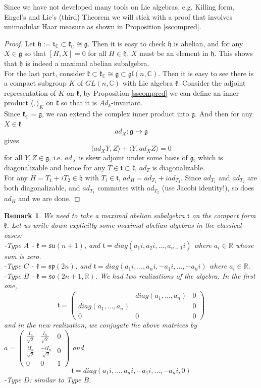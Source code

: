 \documentclass[11pt]{article}
\newtheorem{remark}[theorem]{Remark}
\newcommand{\bb}[1]{\mathbb{#1}}
\newcommand{\mf}[1]{\mathfrak{#1}}
\begin{document}
Since we have not developed many tools on Lie algebras, e.g. Killing form, Engel's and Lie's (third) Theorem we will stick with a proof that involves unimodular Haar measure as shown in Proposition \ref{sscompred}.
\begin{proof}
Let $\mf{h} := \mf{t}_{\bb{C}} \subset \mf{k}_{\bb{C}} \cong \mf{g}$. Then it is easy to check $\mf{h}$ is abelian, and for any $X \in \mf{g}$ so that $[H,X] = 0$ for all $H \in \mf{h}$, $X$ must be an element in $\mf{h}$. This shows that $\mf{h}$ is indeed a maximal abelian subalgebra.\\
For the last part, consider $\mf{k} \subset \mf{k}_{\bb{C}} \cong \mf{g} \subset \mf{gl}(n,\bb{C})$. Then it is easy to see there is a compact subgroup $K$ of $GL(n,\bb{C})$ with Lie algebra $\mf{k}$. Consider the adjoint representation of $K$ on $\mf{k}$, by Proposition \ref{sscompred} we can define an inner product $\langle , \rangle_K$ on $\mf{k}$ so that it is $Ad_k$-invariant.\\
Since $\mf{k}_{\bb{C}} = \mf{g}$, we can extend the complex inner product into $\mf{g}$. And then for any $X \in \mf{k}$
$$ad_X: \mf{g} \to \mf{g}$$
gives
$$\langle ad_XY, Z \rangle + \langle Y, ad_XZ \rangle = 0$$
for all $Y, Z \in \mf{g}$, i.e. $ad_X$ is skew adjoint under some basis of $\mf{g}$, which is diagonalizable and hence for any $T \in \mf{t} \subset \mf{k}$, $ad_T$ is diagonalizable.\\
For any $H = T_1 + iT_2 \in \mf{h}$ with $T_i \in \mf{t}$, $ad_H = ad_{T_1} + iad_{T_2}$. Since $ad_{T_1}$ and $ad_{T_2}$ are both diagonalizable, and $ad_{T_1}$ commutes with $ad_{T_2}$ (use Jacobi identity!), so does $ad_H$ and we are done.
\end{proof}
\begin{remark}
We need to take a maximal abelian subalgebra $\mf{t}$ on the compact form $\mf{k}$. Let us write down explicitly some maximal abelian algebras in the classical cases:\\
-Type $A$ - $\mf{k} = \mf{su}(n+1)$, and $\mf{t} = diag(a_1 i, a_2 i , \dots, a_{n+1} i)$ where $a_i \in \bb{R}$ whose sum is zero.\\
-Type $C$ - $\mf{k} = \mf{sp}(2n)$, and $\mf{t} = diag(a_1 i , \dots, a_{n} i, -a_1 i, \dots, -a_n i)$ where $a_i \in \bb{R}$.\\
-Type $B$ - $\mf{k} = \mf{so}(2n+1,\bb{R})$. We had two realizations of the algebra. In the first one,
$$\mf{t} = \left( \begin{array}{ccc}
 & diag(a_1, \dots, a_n) & 0 \\
diag(a_1, \dots, a_n) & & 0 \\
0 & 0 & 0 \end{array} \right)$$
and in the new realization, we conjugate the above matrices by $a = \left( \begin{array}{ccc}
\frac{I_n}{\sqrt{2}} & \frac{I_n}{\sqrt{2}}  & 0 \\
\frac{iI_n}{\sqrt{2}} & \frac{-iI_n}{\sqrt{2}} & 0 \\
0 & 0 & 1 \end{array} \right)$ and
$$\mf{t} = diag(a_1 i , \dots, a_{n} i, -a_1 i, \dots, -a_n i, 0)$$
-Type $D$: similar to Type $B$.
\end{remark}
\end{document}
